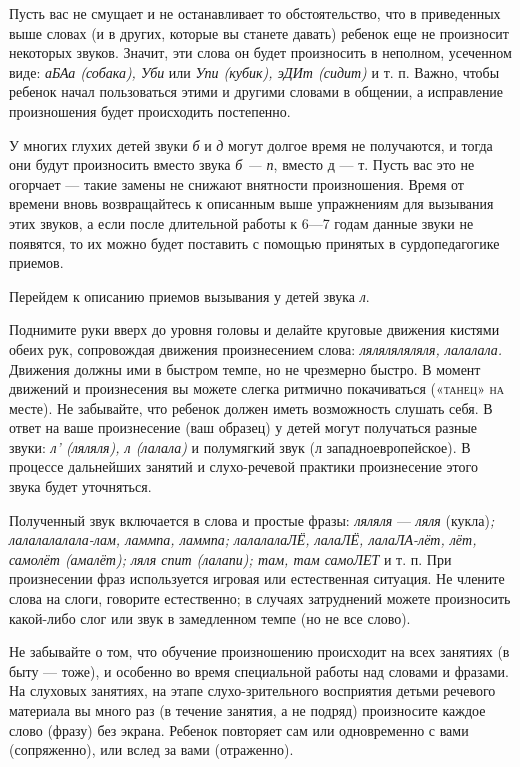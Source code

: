\documentclass{book}
\renewcommand{\emph}[1]{\textit{#1}}
\begin{document}
Пусть вас не смущает и не останавливает то обстоятельство, что в
приведенных выше словах (и в других, которые вы станете давать) ребенок
еще не произносит некоторых звуков. Значит, эти слова он будет
произносить в неполном, усеченном виде: \emph{аБАа (собака), Уби} или
\emph{Упи (кубик), эДИт (сидит)} и т. п. Важно, чтобы ребенок начал
пользоваться этими и другими словами в общении, а исправление
произношения будет происходить постепенно.

У многих глухих детей звуки \emph{б} и \emph{д} могут долгое время не
получаются, и тогда они будут произносить вместо звука \emph{б --- п},
вместо д --- т. Пусть вас это не огорчает --- такие замены не снижают
внятности произношения. Время от времени вновь возвращайтесь к описанным
выше упражнениям для вызывания этих звуков, а если после длительной
работы к 6---7 годам данные звуки не появятся, то их можно будет
поставить с помощью принятых в сурдопедагогике приемов.

Перейдем к описанию приемов вызывания у детей звука \emph{л}.

Поднимите руки вверх до уровня головы и делайте круговые движения
кистями обеих рук, сопровождая движения произнесением слова:
\emph{ляляляляляля, лалалала.} Движения должны ими в быстром темпе, но
не чрезмерно быстро. В момент движений и произнесения вы можете слегка
ритмично покачиваться \textsc{(«танец» на} месте). Не забывайте, что
ребенок должен иметь возможность слушать себя. В ответ на ваше
произнесение (ваш образец) у детей могут получаться разные звуки:
\emph{л' (ляляля), л (лалала)} и полумягкий звук (л западноевропейское).
В процессе дальнейших занятий и слухо-речевой практики произнесение
этого звука будет уточняться.

Полученный звук включается в слова и простые фразы: \emph{ляляля} ---
\emph{ляля} (кукла)\emph{; лалалалалала-лам, ламмпа, ламмпа; лалалалаЛЁ,
лалаЛЁ, лалаЛА-лёт, лёт, самолёт (амалёт); ляля спит (лалапи); там, там
самоЛЕТ} и т. п. При произнесении фраз используется игровая или
естественная ситуация. Не члените слова на слоги, говорите естественно;
в случаях затруднений можете произносить какой-либо слог или звук в
замедленном темпе (но не все слово).

Не забывайте о том, что обучение произношению происходит на всех
занятиях (в быту --- тоже), и особенно во время специальной работы над
словами и фразами. На слуховых занятиях, на этапе слухо-зрительного
восприятия детьми речевого материала вы много раз (в течение занятия, а
не подряд) произносите каждое слово (фразу) без экрана. Ребенок
повторяет сам или одновременно с вами (сопряженно), или вслед за вами
(отраженно).
\end{document}
